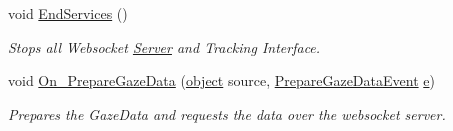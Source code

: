 \begin{DoxyCompactItemize}
void \hyperlink{class_web_analyzer_1_1_controller_1_1_test_controller_af7260e39f8963732f38631dd618da497}{End\+Services} ()
\begin{DoxyCompactList}\small\item\em Stops all Websocket \hyperlink{namespace_web_analyzer_1_1_server}{Server} and Tracking Interface. \end{DoxyCompactList}\item 
void \hyperlink{class_web_analyzer_1_1_controller_1_1_test_controller_a61584d87704fffabf4ff0f8c04b33407}{On\+\_\+\+Prepare\+Gaze\+Data} (\hyperlink{_u_i_2_h_t_m_l_resources_2js_2lib_2underscore_8min_8js_aae18b7515bb2bc4137586506e7c0c903}{object} source, \hyperlink{class_web_analyzer_1_1_events_1_1_prepare_gaze_data_event}{Prepare\+Gaze\+Data\+Event} \hyperlink{_u_i_2_h_t_m_l_resources_2js_2lib_2bootstrap_8min_8js_ab5902775854a8b8440bcd25e0fe1c120}{e})
\begin{DoxyCompactList}\small\item\em Prepares the Gaze\+Data and requests the data over the websocket server. \end{DoxyCompactList}\end{DoxyCompactItemize}
